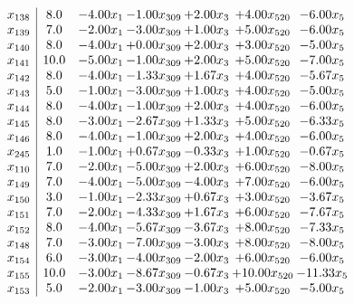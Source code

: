 \documentclass[8pt]{article}
\begin{document}
\[\begin{array}{c| c c@{\hskip 2pt} c@{\hskip 2pt} c@{\hskip 2pt} c@{\hskip 2pt} c@{\hskip 2pt} }
 x_{138}   &  8.0 & -4.00 x_{1} & -1.00 x_{309} & +  2.00 x_{3} & +  4.00 x_{520} & -6.00 x_{5}\\
 x_{139}   &  7.0 & -2.00 x_{1} & -3.00 x_{309} & +  1.00 x_{3} & +  5.00 x_{520} & -6.00 x_{5}\\
 x_{140}   &  8.0 & -4.00 x_{1} & +  0.00 x_{309} & +  2.00 x_{3} & +  3.00 x_{520} & -5.00 x_{5}\\
 x_{141}   &  10.0 & -5.00 x_{1} & -1.00 x_{309} & +  2.00 x_{3} & +  5.00 x_{520} & -7.00 x_{5}\\
 x_{142}   &  8.0 & -4.00 x_{1} & -1.33 x_{309} & +  1.67 x_{3} & +  4.00 x_{520} & -5.67 x_{5}\\
 x_{143}   &  5.0 & -1.00 x_{1} & -3.00 x_{309} & +  1.00 x_{3} & +  4.00 x_{520} & -5.00 x_{5}\\
 x_{144}   &  8.0 & -4.00 x_{1} & -1.00 x_{309} & +  2.00 x_{3} & +  4.00 x_{520} & -6.00 x_{5}\\
 x_{145}   &  8.0 & -3.00 x_{1} & -2.67 x_{309} & +  1.33 x_{3} & +  5.00 x_{520} & -6.33 x_{5}\\
 x_{146}   &  8.0 & -4.00 x_{1} & -1.00 x_{309} & +  2.00 x_{3} & +  4.00 x_{520} & -6.00 x_{5}\\
 x_{245}   &  1.0 & -1.00 x_{1} & +  0.67 x_{309} & -0.33 x_{3} & +  1.00 x_{520} & -0.67 x_{5}\\
 x_{110}   &  7.0 & -2.00 x_{1} & -5.00 x_{309} & +  2.00 x_{3} & +  6.00 x_{520} & -8.00 x_{5}\\
 x_{149}   &  7.0 & -4.00 x_{1} & -5.00 x_{309} & -4.00 x_{3} & +  7.00 x_{520} & -6.00 x_{5}\\
 x_{150}   &  3.0 & -1.00 x_{1} & -2.33 x_{309} & +  0.67 x_{3} & +  3.00 x_{520} & -3.67 x_{5}\\
 x_{151}   &  7.0 & -2.00 x_{1} & -4.33 x_{309} & +  1.67 x_{3} & +  6.00 x_{520} & -7.67 x_{5}\\
 x_{152}   &  8.0 & -4.00 x_{1} & -5.67 x_{309} & -3.67 x_{3} & +  8.00 x_{520} & -7.33 x_{5}\\
 x_{148}   &  7.0 & -3.00 x_{1} & -7.00 x_{309} & -3.00 x_{3} & +  8.00 x_{520} & -8.00 x_{5}\\
 x_{154}   &  6.0 & -3.00 x_{1} & -4.00 x_{309} & -2.00 x_{3} & +  6.00 x_{520} & -6.00 x_{5}\\
 x_{155}   &  10.0 & -3.00 x_{1} & -8.67 x_{309} & -0.67 x_{3} & + 10.00 x_{520} & -11.33 x_{5}\\
 x_{153}   &  5.0 & -2.00 x_{1} & -3.00 x_{309} & -1.00 x_{3} & +  5.00 x_{520} & -5.00 x_{5}\\

\end{array}\]
\end{document}
